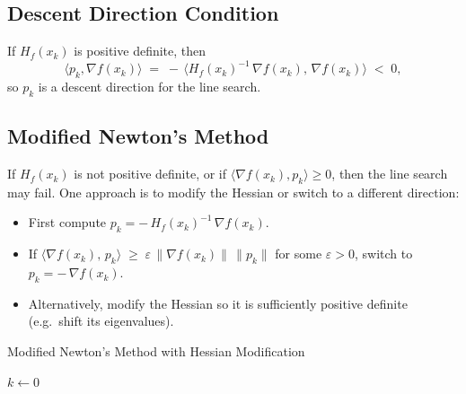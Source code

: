 \subsection*{Descent Direction Condition}
If \(H_f(x_k)\) is positive definite, then
\[
  \langle p_k, \nabla f(x_k)\rangle
  \;=\;
  -\,\langle H_f(x_k)^{-1}\,\nabla f(x_k),\,\nabla f(x_k)\rangle
  \;<\; 0,
\]
so \(p_k\) is a descent direction for the line search.

\subsection*{Modified Newton's Method}
If \(H_f(x_k)\) is not positive definite, or if \(\langle \nabla f(x_k), p_k\rangle \geq 0\), then the line search may fail. One approach is to modify the Hessian or switch to a different direction:

\begin{itemize}
  \item First compute \(p_k = -\,H_f(x_k)^{-1}\,\nabla f(x_k)\).
  \item If \(\langle \nabla f(x_k),\,p_k\rangle \;\ge\; \varepsilon \,\|\nabla f(x_k)\|\,\|p_k\|\) for some \(\varepsilon > 0\), switch to \(p_k = -\,\nabla f(x_k)\).
  \item Alternatively, modify the Hessian so it is sufficiently positive definite (e.g.\ shift its eigenvalues).
\end{itemize}

\begin{algorithm}[H]
  \caption{Modified Newton's Method with Hessian Modification}
  \label{alg:newton-modified}
  \(k \gets 0\)\;
  \;
\end{algorithm}

